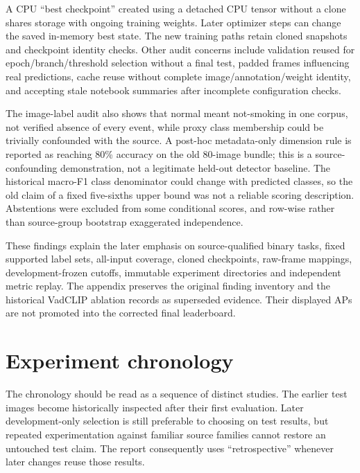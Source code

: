 A CPU ``best checkpoint'' created using a detached CPU tensor without a clone shares storage with ongoing training weights. Later optimizer steps can change the saved in-memory best state. The new training paths retain cloned snapshots and checkpoint identity checks. Other audit concerns include validation reused for epoch/branch/threshold selection without a final test, padded frames influencing real predictions, cache reuse without complete image/annotation/weight identity, and accepting stale notebook summaries after incomplete configuration checks.

The image-label audit also shows that normal meant not-smoking in one corpus, not verified absence of every event, while proxy class membership could be trivially confounded with the source. A post-hoc metadata-only dimension rule is reported as reaching 80\% accuracy on the old 80-image bundle; this is a source-confounding demonstration, not a legitimate held-out detector baseline. The historical macro-F1 class denominator could change with predicted classes, so the old claim of a fixed five-sixths upper bound was not a reliable scoring description. Abstentions were excluded from some conditional scores, and row-wise rather than source-group bootstrap exaggerated independence.

These findings explain the later emphasis on source-qualified binary tasks, fixed supported label sets, all-input coverage, cloned checkpoints, raw-frame mappings, development-frozen cutoffs, immutable experiment directories and independent metric replay. The appendix preserves the original finding inventory and the historical VadCLIP ablation records as superseded evidence. Their displayed APs are not promoted into the corrected final leaderboard.

\section{Experiment chronology}

The chronology should be read as a sequence of distinct studies. The earlier test images become historically inspected after their first evaluation. Later development-only selection is still preferable to choosing on test results, but repeated experimentation against familiar source families cannot restore an untouched test claim. The report consequently uses ``retrospective'' whenever later changes reuse those results.


